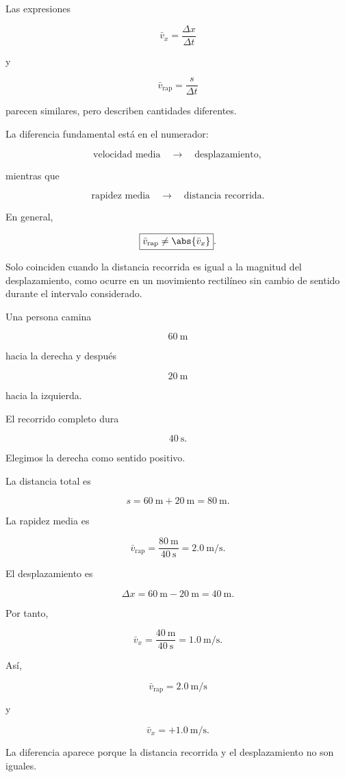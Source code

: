 Las expresiones

\[ \bar{v}_x=\frac{\Delta x}{\Delta t} \]

y

\[ \bar{v}_{\text{rap}}=\frac{s}{\Delta t} \]

parecen similares, pero describen cantidades diferentes.

La diferencia fundamental está en el numerador:

\[
\text{velocidad media}
\quad\longrightarrow\quad
\text{desplazamiento},
\]

mientras que

\[
\text{rapidez media}
\quad\longrightarrow\quad
\text{distancia recorrida}.
\]

\begin{idea}
En general,

\[ \boxed{\bar{v}_{\text{rap}}\neq\abs{\bar{v}_x}}. \]

Solo coinciden cuando la distancia recorrida es igual a la magnitud del
desplazamiento, como ocurre en un movimiento rectilíneo sin cambio de
sentido durante el intervalo considerado.
\end{idea}


\begin{ejemplo}

Una persona camina

\[ \SI{60}{\meter} \]

hacia la derecha y después

\[ \SI{20}{\meter} \]

hacia la izquierda.

El recorrido completo dura

\[ \SI{40}{\second}. \]

Elegimos la derecha como sentido positivo.

La distancia total es

\[
s=\SI{60}{\meter}+\SI{20}{\meter}
=\SI{80}{\meter}.
\]

La rapidez media es

\[
\bar{v}_{\text{rap}}
=\frac{\SI{80}{\meter}}{\SI{40}{\second}}
=\SI{2.0}{\meter\per\second}.
\]

El desplazamiento es

\[
\Delta x
=\SI{60}{\meter}-\SI{20}{\meter}
=\SI{40}{\meter}.
\]

Por tanto,

\[
\bar{v}_x
=\frac{\SI{40}{\meter}}{\SI{40}{\second}}
=\SI{1.0}{\meter\per\second}.
\]

Así,

\[
\boxed{\bar{v}_{\text{rap}}
=\SI{2.0}{\meter\per\second}}
\]

y

\[
\boxed{\bar{v}_x
=+\SI{1.0}{\meter\per\second}}.
\]

La diferencia aparece porque la distancia recorrida y el desplazamiento no
son iguales.
\end{ejemplo}


